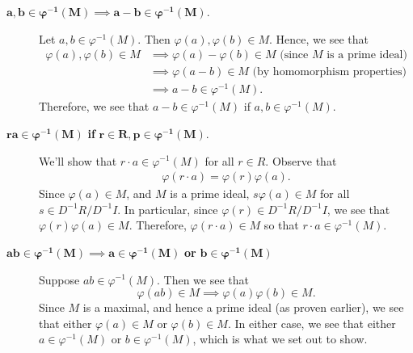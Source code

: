 \documentclass[12pt,letterpaper]{algebra_book}
\renewcommand{\phi}{\varphi}
\theoremstyle{definition}
\begin{document}
\begin{prf}
\begin{enumerate}
\begin{itemize}
\begin{description}
                    \item[$\bm{a, b \in \phi^{-1}(M)\implies a-b \in \phi^{-1}(M)}$.] 
                    Let $a, b \in \phi^{-1}(M)$. Then $\phi(a), \phi(b) \in M$.
                    Hence, we see that 
                    \begin{align*}
                        \phi(a), \phi(b) \in M & \implies \phi(a) - \phi(b) \in M \text{ (since } M \text{ is a prime ideal)}\\
                        & \implies \phi(a - b) \in M \text{ (by homomorphism properties)}\\
                        & \implies a - b \in \phi^{-1}(M).
                    \end{align*}
                    Therefore, we see that $a - b \in \phi^{-1}(M)$ if $a, b \in
                    \phi^{-1}(M)$.  
        
                    \item[$\bm{ra \in \phi^{-1}(M)}$ \textbf{if} $\bm{r \in R, p \in \phi^{-1}(M)}$.] 
                    We'll show that $r \cdot a \in \phi^{-1}(M)$ for all
                    $r \in R$. Observe that 
                    \begin{align*}
                        \phi(r\cdot a) = \phi(r)\phi(a).
                    \end{align*}
                    Since $\phi(a) \in M$, and $M$ is a prime ideal, $s\phi(a) \in M$
                    for all $s \in D^{-1}R/D^{-1}I$. In particular, since $\phi(r) \in D^{-1}R/D^{-1}I$, we
                    see that $\phi(r)\phi(a) \in M$. Therefore, $\phi(r \cdot a)
                    \in M$ so that $r\cdot a \in \phi^{-1}(M)$.
        
                    \item[$\bm{ab \in \phi^{-1}(M) \implies a \in \phi^{-1}(M)}$ \textbf{or} $\bm{b \in \phi^{-1}(M)}$]
                    Suppose $ab \in \phi^{-1}(M)$. Then we see that 
                    \[ 
                        \phi(ab) \in M \implies \phi(a)\phi(b) \in M.
                    \]
                    Since $M$ is a maximal, and hence a prime ideal (as
                    proven earlier), we see that either $\phi(a)
                    \in M$ or $\phi(b) \in M$. In either case, we see that
                    either $a \in \phi^{-1}(M)$ or $b \in \phi^{-1}(M)$, which
                    is what we set out to show.
    

\end{description}
\end{itemize}
\end{enumerate}
\end{prf}
\end{document}
